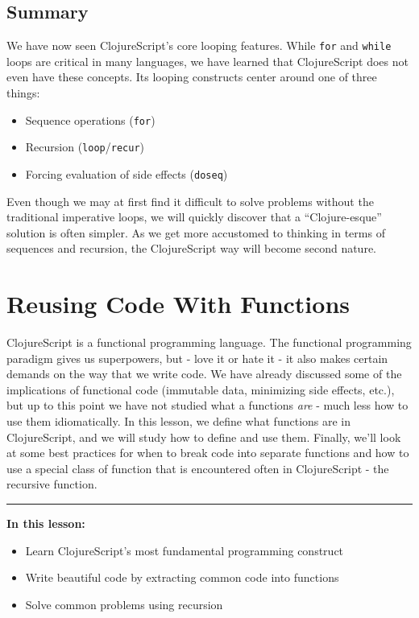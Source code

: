 \documentclass[10pt,twoside,openright]{memoir}
\begin{document}
\section{Summary}

We have now seen ClojureScript's core looping features. While
\texttt{for} and \texttt{while} loops are critical in many languages, we
have learned that ClojureScript does not even have these concepts. Its
looping constructs center around one of three things:

\begin{itemize}
\tightlist
\item
  Sequence operations (\texttt{for})
\item
  Recursion (\texttt{loop}/\texttt{recur})
\item
  Forcing evaluation of side effects (\texttt{doseq})
\end{itemize}

Even though we may at first find it difficult to solve problems without
the traditional imperative loops, we will quickly discover that a
``Clojure-esque'' solution is often simpler. As we get more accustomed
to thinking in terms of sequences and recursion, the ClojureScript way
will become second nature.

\chapter{Reusing Code With Functions}

ClojureScript is a functional programming language. The functional
programming paradigm gives us superpowers, but - love it or hate it - it
also makes certain demands on the way that we write code. We have
already discussed some of the implications of functional code (immutable
data, minimizing side effects, etc.), but up to this point we have not
studied what a functions \emph{are} - much less how to use them
idiomatically. In this lesson, we define what functions are in
ClojureScript, and we will study how to define and use them. Finally,
we'll look at some best practices for when to break code into separate
functions and how to use a special class of function that is encountered
often in ClojureScript - the recursive function.

\begin{center}\rule{0.5\linewidth}{0.5pt}\end{center}

\textbf{In this lesson:}

\begin{itemize}
\tightlist
\item
  Learn ClojureScript's most fundamental programming construct
\item
  Write beautiful code by extracting common code into functions
\item
  Solve common problems using recursion
\end{itemize}
\end{document}
